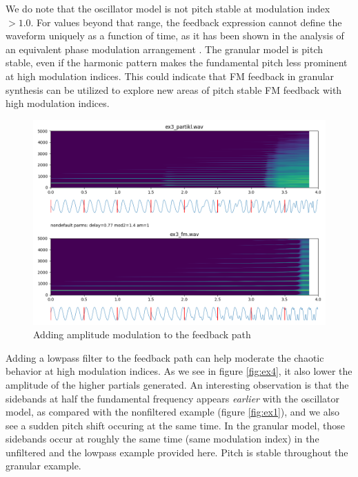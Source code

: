 \documentclass[runningheads,a4paper]{llncs}
\begin{document}
We do note that the oscillator model is not pitch stable at modulation index $> 1.0$.  For values beyond that range, the feedback expression cannot define the waveform uniquely as a function of time, as it has been shown in the analysis of an equivalent phase modulation arrangement \cite[p.61]{Benson}.
The granular model is pitch stable, even if the harmonic pattern makes the fundamental pitch less prominent at high modulation indices. This could indicate that FM feedback in granular synthesis can be utilized to explore new areas of pitch stable FM feedback with high modulation indices.

\begin{figure}
	\centering
	\includegraphics[width=.95\textwidth]{ex3_compare.png}
	\caption{Adding amplitude modulation to the feedback path}
	\label{fig:ex3}
\end{figure}

Adding a lowpass filter to the feedback path can help moderate the chaotic behavior at high modulation indices. As we see in figure \ref{fig:ex4}, it also lower the amplitude of the higher partials generated. An interesting observation is that the sidebands at half the fundamental frequency appears \emph{earlier} with the oscillator model, as compared with the nonfiltered example (figure \ref{fig:ex1}), and we also see a sudden pitch shift occuring at the same time. In the granular model, those sidebands occur at roughly the same time (same modulation index) in the unfiltered and the lowpass example provided here. Pitch is stable throughout the granular example.
\end{document}

